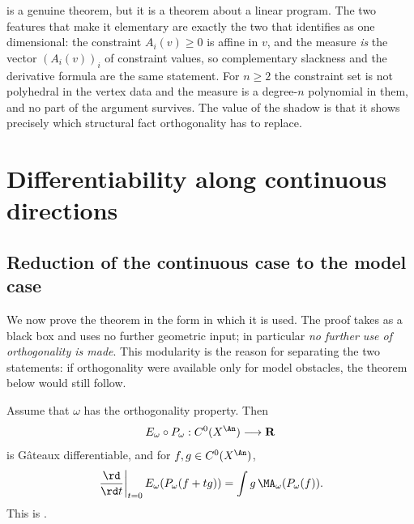 \begin{remark}
\label{rem:ch27-shadow-scope}
 is a genuine theorem, but it is a theorem
about a linear program.  The two features that make it elementary are
exactly the two that
 identifies as one dimensional: the
constraint $A_i(v)\geq0$ is affine in $v$, and the measure \emph{is} the
vector $(A_i(v))_i$ of constraint values, so complementary slackness and
the derivative formula are the same statement.  For $n\geq2$ the
constraint set is not polyhedral in the vertex data and the measure is a
degree-$n$ polynomial in them, and no part of the argument survives.  The
value of the shadow is that it shows precisely which structural fact
orthogonality has to replace.
\end{remark}

\section{Differentiability along continuous directions}
\label{sec:ch27-continuous-directions}

\subsection{Reduction of the continuous case to the model case}
\label{sec:ch27-reduction}

We now prove the theorem in the form in which it is used.  The proof takes
 as a black box and uses no
further geometric input; in particular \emph{no further use of
orthogonality is made}.  This modularity is the reason for separating the
two statements: if orthogonality were available only for model obstacles,
the theorem below would still follow.

\begin{theorem}\label{thm:energy-envelope-differentiability}
Assume that $\omega$ has the orthogonality property. Then
\[
                E_\omega\circ P_\omega:C^0(X^{\An})\longrightarrow\mathbf R
\]
is G\^ateaux differentiable, and for $f,g\in C^0(X^{\An})$,
\begin{equation}\label{eq:energy-envelope-derivative}
 \left.\frac{\rd}{\rd t}\right|_{t=0}
 E_\omega(P_\omega(f+tg))
 =\int g\,\MA_\omega(P_\omega(f)).
\end{equation}
This is \cite[Theorem~7.2]{BFJ15}.
\end{theorem}

